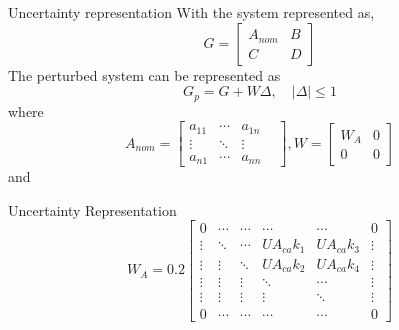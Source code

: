 
\begin{frame}{Uncertainty representation}
	With the system represented as,
		\begin{equation*}
			G = \left\lbrack \begin{array}{cc}
				A_{nom} & B\\
				C & D
			\end{array}\right\rbrack
		\end{equation*}
	The perturbed system can be represented as
		\begin{equation*}
			G_p = G + W\Delta, \quad |\Delta|\leq 1
		\end{equation*}
	where
		\begin{equation*} 
			A_{nom} =
			\begin{bmatrix}
				a_{11} & \cdots &  a_{1n} & \\
				\vdots & \ddots & \vdots & \\
				a_{n1} & \cdots & a_{nn} &
			\end{bmatrix}, W = \left\lbrack \begin{array}{cc}
			W_A & 0\\
			0 & 0 \end{array}\right\rbrack 
		\end{equation*}
	and
\end{frame}




\begin{frame}{Uncertainty Representation}{}
	\begin{equation*}
		W_A = 0.2\begin{bmatrix}
			0      & \cdots & \cdots & \cdots     & \cdots     & 0      \\
			\vdots & \ddots & \cdots & UA_{ca}k_1 & UA_{ca}k_3 & \vdots \\
			\vdots & \vdots & \ddots & UA_{ca}k_2 & UA_{ca}k_4 & \vdots \\
			\vdots & \vdots & \vdots & \ddots     & \cdots     & \vdots \\
			\vdots & \vdots & \vdots & \vdots     & \ddots     & \vdots \\
			0      & \cdots & \cdots & \cdots     & \cdots     & 0
		\end{bmatrix}
	\end{equation*}
	\begin{figure}[h!]
		\centering
		\resizebox{\columnwidth}{!}{
			}
		\label{fig:tikzControlStrat}
	\end{figure}
\end{frame}
